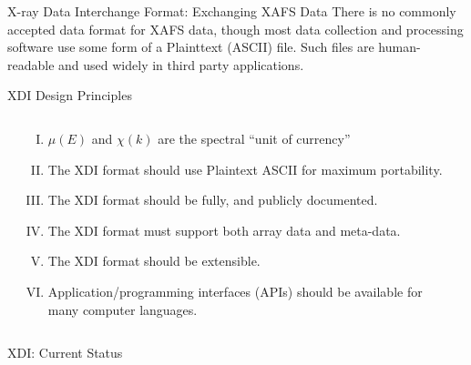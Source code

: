 \documentclass[final]{beamer}
\begin{document}
\begin{frame}{}
\begin{columns}[t]
\begin{column}{.54\linewidth}
\begin{block}{\large  X-ray Data Interchange Format:  Exchanging
            XAFS Data}
          There is no commonly accepted data format for XAFS data, though
          most data collection and processing software use some form of a
          Plainttext (ASCII) file.  Such files are human-readable and used
          widely in third party applications.

          
        \end{block}
        
        \begin{block}{\large XDI Design Principles}

          \begin{columns}[T]
            \begin{column}{0.05\linewidth}    \end{column}
            \begin{column}{0.90\linewidth}
              
              \begin{enumerate}[I.] \normalsize
              \item $\mu(E)$ and $\chi(k)$ are the spectral ``unit of  currency''
              \item The XDI format should use Plaintext ASCII for maximum portability.
              \item The XDI format should be fully, and publicly documented.
              \item The XDI format must support both array data and meta-data.
              \item The XDI format should be extensible.
              \item Application/programming interfaces (APIs) should be
                available for many computer languages.
              \end{enumerate}

            \end{column}
            \begin{column}{0.05\linewidth}    \end{column}
          \end{columns} 
        \end{block}
        
        \begin{block}{\large XDI: Current Status}


\end{block}
\end{column}
\end{columns}
\end{frame}
\end{document}
